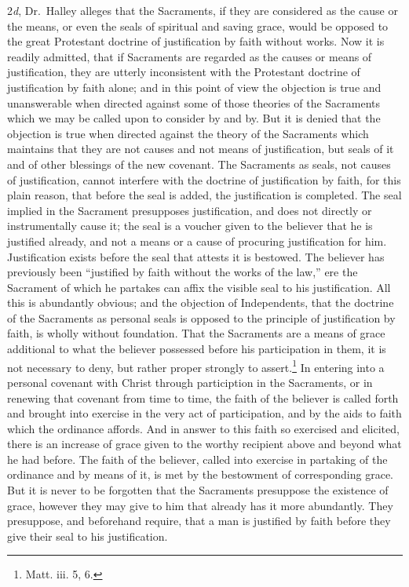 \documentclass[]{book}
\begin{document}
2\emph{d}, Dr.~Halley alleges that the Sacraments, if they are considered as the cause or the means, or even the seals of spiritual and saving grace, would be opposed to the great Protestant doctrine of justification by faith without works. Now it is readily admitted, that if Sacraments are regarded as the causes or means of justification, they are utterly inconsistent with the Protestant doctrine of justification by faith alone; and in this point of view the objection is true and unanswerable when directed against some of those theories of the Sacraments which we may be called upon to consider by and by. But it is denied that the objection is true when directed against the theory of the Sacraments which maintains that they are not causes and not means of justification, but seals of it and of other blessings of the new covenant. The Sacraments as seals, not causes of justification, cannot interfere with the doctrine of justification by faith, for this plain reason, that before the seal is added, the justification is completed. The seal implied in the Sacrament presupposes justification, and does not directly or instrumentally cause it; the seal is a voucher given to the believer that he is justified already, and not a means or a cause of procuring justification for him. Justification exists before the seal that attests it is bestowed. The believer has previously been ``justified by faith without the works of the law,'' ere the Sacrament of which he partakes can affix the visible seal to his justification. All this is abundantly obvious; and the objection of Independents, that the doctrine of the Sacraments as personal seals is opposed to the principle of justification by faith, is wholly without foundation. That the Sacraments are a means of grace additional to what the believer possessed before his participation in them, it is not necessary to deny, but rather proper strongly to assert.\footnote{Matt. iii. 5, 6.} In entering into a personal covenant with Christ through particiption in the Sacraments, or in renewing that covenant from time to time, the faith of the believer is called forth and brought into exercise in the very act of participation, and by the aids to faith which the ordinance affords. And in answer to this faith so exercised and elicited, there is an increase of grace given to the worthy recipient above and beyond what he had before. The faith of the believer, called into exercise in partaking of the ordinance and by means of it, is met by the bestowment of corresponding grace. But it is never to be forgotten that the Sacraments presuppose the existence of grace, however they may give to him that already has it more abundantly. They presuppose, and beforehand require, that a man is justified by faith before they give their seal to his justification.
\end{document}
